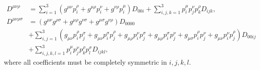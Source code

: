 \documentclass[../main.tex]{subfiles}
\begin{document}
\begin{donotread}
\begin{subequations}
\begin{align}
      D^{\mu\nu\rho}       & = \sum_{i=1}^3 (g^{\mu\nu} p_i^{\rho} +
      g^{\mu\rho} p_i^{\nu} + g^{\nu\rho} p_i^{\mu}) D_{00i} +
      \sum_{i,j,k=1}^3
      p_i^\mu p_j^\nu p_k^\rho D_{ijk},
      \\
      \nonumber
      D^{\mu\nu\rho\sigma} & = (g^{\mu\nu}g^{\rho\sigma} +
      g^{\mu\rho}g^{\nu\sigma} + g^{\mu\sigma}g^{\nu\rho})D_{0000}
      \\
      \nonumber
                           & + \sum_{i,j=1}^3 (g_{\mu\nu}p_i^\rho p_j^\sigma
      + g_{\mu\nu}p_i^\sigma p_j^\rho + g_{\mu\rho}p_i^\nu p_j^\sigma +
      g_{\mu\rho}p_i^\sigma p_j^\nu + g_{\mu\sigma}p_i^\rho p_j^\nu +
      g_{\mu\nu}p_i^\nu p_j^\rho) D_{00ij}
      \\
                           & + \sum_{i,j,k,l=1}^3 p_i^\mu p_j^\nu p_k^\rho
      p_l^\sigma D_{ijkl},
    \end{align}
  \end{subequations}
  where all coefficients must be completely symmetric in \(i,j,k,l\).
\end{donotread}
\end{document}
